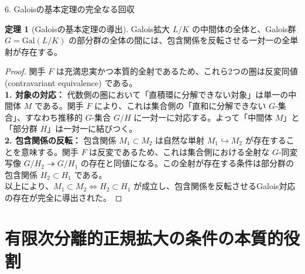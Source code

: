 \documentclass[10pt, unicode]{beamer}
\theoremstyle{definition}
\newtheorem{thm}{定理}
\begin{document}
\begin{frame}[allowframebreaks]{6. Galoisの基本定理の完全なる回収}
    \begin{thm}[Galoisの基本定理の導出]
        Galois拡大 $L/K$ の中間体の全体と、Galois群 $G = \mathrm{Gal}(L/K)$ の部分群の全体の間には、包含関係を反転させる一対一の全単射が存在する。
    \end{thm}

    \begin{proof}
        関手 $F$ は充満忠実かつ本質的全射であるため、これら2つの圏は反変同値 (contravariant equivalence) である。\\
        \textbf{1. 対象の対応：} 代数側の圏において「直積環に分解できない対象」は単一の中間体 $M$ である。関手 $F$ により、これは集合側の「直和に分解できない $G$-集合」、すなわち推移的 $G$-集合 $G/H$ に一対一に対応する。よって「中間体 $M$」と「部分群 $H$」は一対一に結びつく。\\
        \textbf{2. 包含関係の反転：} 包含関係 $M_1 \subset M_2$ は自然な単射 $M_1 \hookrightarrow M_2$ が存在することを意味する。関手 $F$ は反変であるため、これは集合側における全射な $G$-同変写像 $G/H_2 \twoheadrightarrow G/H_1$ の存在と同値になる。この全射が存在する条件は部分群の包含関係 $H_2 \subset H_1$ である。\\
        以上により、$M_1 \subset M_2 \iff H_2 \subset H_1$ が成立し、包含関係を反転させるGalois対応の存在が完全に導出された。
    \end{proof}
\end{frame}

\section{有限次分離的正規拡大の条件の本質的役割}
\end{document}
